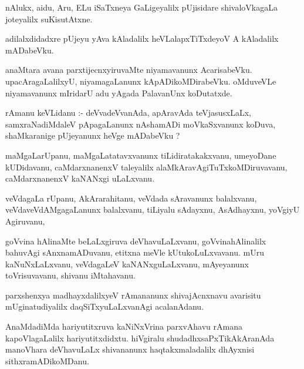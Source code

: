 \documentclass{article}
\begin{document}
\begin{mn}
nAlukx,  aidu,  Aru,  ELu  iSaTxneya  GaLigeyalilx  pUjisidare  shivaloVkagaLa  joteyalilx  suKisutAtxne.
\end{mn}

\begin{mn}
adilalxdidadxre  pUjeyu  yAva  kAladalilx  heVLalapxTiTxdeyoV  A  kAladalilx  mADabeVku.
\end{mn}

\begin{mn}
anaMtara  avana  parxtijecnxyiruvaMte  niyamavanunx  AcarisabeVku.  upacAragaLalilxyU,  niyamagaLanunx  kApADikoMDirabeVku.  
oMduveVLe  niyamavanunx  mIridarU  adu  yAgada  PalavanUnx  koDutatxde.
\end{mn}

\begin{mn}
rAmanu  keVLidanu :- deVvadeVvanAda,  apAravAda  teVjasusxLaLx,  samxraNadiMdaleV  pApagaLanunx  nAshamADi  moVkaSxvanunx  
koDuva,  shaMkaranige  pUjeyanunx  heVge mADabeVku ?
\end{mn}

\begin{mn}
maMgaLarUpanu,  maMgaLatatavxvanunx  tiLidiratakakxvanu,  umeyoDane  kUDidavanu,  caMdarxnanenxV  taleyalilx  
alaMkAravAgiTuTxkoMDiruvavanu,  caMdarxnanenxV  kaNANxgi  uLaLxvanu.
\end{mn}

\begin{mn}
veVdagaLa  rUpanu,  AkArarahitanu,  veVdada  sAravanunx  balalxvanu,  veVdaveVdAMgagaLanunx  balalxvanu,  tiLiyalu  
sAdayxnu,  AsAdhayxnu,  yoVgiyU  Agiruvanu,
\end{mn}

\begin{mn}
goVvina  hAlinaMte  beLaLxgiruva  deVhavuLaLxvanu,  goVvinahAlinalilx  bahuvAgi  sAnxnamADuvanu,  etitxna  meVle  
kUtukoLuLxvavanu.  mUru  kaNuNxLaLxvanu,  veVdagaLeV  kaNANxguLaLxvanu,  mAyeyanunx  toVrisuvavanu,  shivanu  iMtahavanu.
\end{mn}

\begin{mn}
parxshenxya  madhayxdalilxyeV  rAmananunx  shivajAcnxnavu  avarisitu  mUginatudiyalilx  daqSiTxyuLaLxvanAgi  acalanAdanu.
\end{mn}

\begin{mn}
AnaMdadiMda  hariyutitxruva  kaNiNxVrina  parxvAhavu  rAmana  kapoVlagaLalilx  hariyutitxdidxtu.  hiVgiralu  shudadhxsaPxTikAkAranAda  
manoVhara  deVhavuLaLx  shivananunx  haqtakxmaladalilx  dhAyxnisi  sithxramADikoMDanu.
\end{mn}
\end{document}
